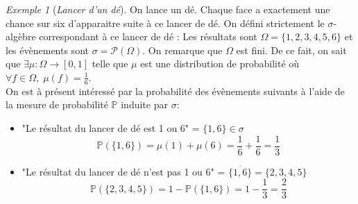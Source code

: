\documentclass[12pt,a4paper]{report}
\theoremstyle{definition}
\theoremstyle{remark}
\newtheorem{example}{Exemple}[chapter]
\newcommand{\ie}{\textit{i.e.}, }
\newcommand{\pr}{\mathbb{P}}
\let\labelitemi\labelitemii
\begin{document}
\begin{example}[\textit{Lancer d'un dé}]
	On lance un dé. Chaque face a exactement une chance sur six d'apparaitre suite à ce lancer de dé. On défini strictement le $\sigma$-algèbre correspondant à ce lancer de dé : 
	Les résultats sont $\Omega = \{1, 2, 3, 4, 5, 6\}$ et les évènements sont $\sigma = \mathcal{P}(\Omega)$.
	On remarque que $\Omega$ est fini.
	De ce fait, on sait que $\exists \mu: \Omega \rightarrow [0,1]$ telle que $\mu$ est une distribution de probabilité
	où $\forall f \in \Omega, \; \mu(f) = \frac{1}{6}$.\\
	On est à présent intéressé par la probabilité des évènements suivants à l'aide de la mesure de probabilité $\pr$ induite par $\sigma$:
	\begin{itemize}
		\renewcommand{\labelitemi}{\tiny$\bullet$}
		\item "Le résultat du lancer de dé est 1 ou 6" = $\{1, 6\} \in \sigma$
		\[\pr(\{1,6\}) = \mu(1) + \mu(6) = \frac{1}{6} + \frac{1}{6} = \frac{1}{3}\]
		\item "Le résultat du lancer de dé n'est pas 1 ou 6" = $\overline{\{1, 6\}} = \{2, 3, 4, 5\}$
		\[\pr(\{2, 3, 4, 5\}) = 1 - \pr(\{1, 6\}) = 1 - \frac{1}{3} = \frac{2}{3}\]
	\end{itemize}
\end{example}

\end{document}
